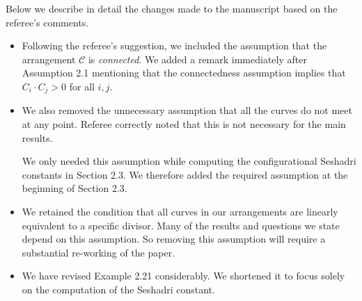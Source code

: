 \documentclass[12pt,twoside,reqno]{amsart}
\numberwithin{equation}{section}
\theoremstyle{definition}
\begin{document}
Below we describe in detail the changes made to the manuscript based on the referee's comments. 
\begin{itemize}
\item Following the referee's suggestion, we included the assumption that the arrangement $\mathcal{C}$ is \textit{connected}. We added a remark immediately after Assumption 2.1 mentioning that the connectedness assumption implies that $C_i \cdot C_j > 0$ for all $i,j$.

\item We also removed the unnecessary assumption that all the curves do not meet at any point. Referee correctly noted that this is not necessary for the main results. 

We only needed this assumption while computing the configurational Seshadri constants in Section 2.3. We therefore added the required assumption at the beginning of Section 2.3. 

\item We retained the condition that all curves in our arrangements are linearly equivalent to a specific divisor. Many of the results and questions we state depend on this assumption. So removing this assumption will require a substantial re-working of the paper. 


\item We have revised Example 2.21 considerably. We shortened it to focus solely on the computation of the Seshadri constant.
\end{itemize}


\end{document}
